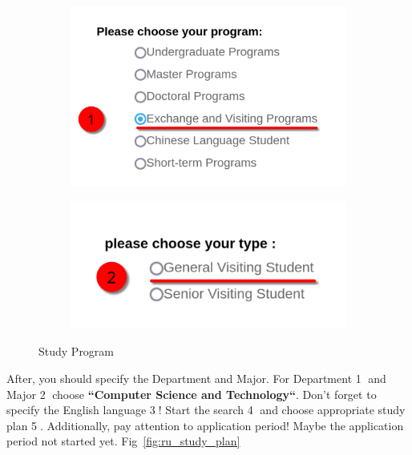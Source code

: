 \begin{figure}[htbp]
    \centering
    \begin{subfigure}[c]{0.49\textwidth}
        \centering
        \includegraphics[width=\textwidth]{01_russia/imgs/app_1}
    \end{subfigure}
    \hfill
    \begin{subfigure}[c]{0.49\textwidth}
        \centering
        \includegraphics[width=\textwidth]{01_russia/imgs/app_2}
    \end{subfigure}
    \caption{Study Program}
    \label{fig:ru_student_type}
\end{figure}


After, you should specify the Department and Major.
For Department \textcircled{1} and Major \textcircled{2} choose
\textbf{``Computer Science and Technology``}.
Don't forget to specify the English language \textcircled{3}!
Start the search \textcircled{4} and choose appropriate study plan \textcircled{5}.
Additionally, pay attention to application period!
Maybe the application period not started yet.
Fig~\ref{fig:ru_study_plan}


